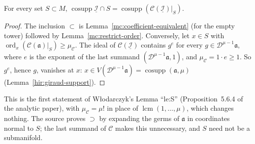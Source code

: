 \begin{lemma}
\label{mc:coefficient-restriction-support}
\leanok
For every set \(S\subset M\), \(\operatorname{cosupp}\underline{\mathcal I}\cap S=\operatorname{cosupp}(\mathcal C(\underline{\mathcal I})|_S)\).
\end{lemma}
\begin{proof}
\leanok
The inclusion \(\subset\) is Lemma~\ref{mc:coefficient-equivalent} (for the empty tower) followed by Lemma~\ref{mc:restrict-order}. Conversely, let
\(x\in S\) with \(\operatorname{ord}_x(\mathcal C(\mathfrak a)|_S)\ge\mu_{\mathcal C}\). The ideal of \(\mathcal C(\underline{\mathcal I})\) contains
\(g^e\) for every \(g\in\mathcal D^{\mu-1}\mathfrak a\), where \(e\) is the exponent of the last summand \((\mathcal D^{\mu-1}\mathfrak a,1)\), and
\(\mu_{\mathcal C}=1\cdot e\ge1\). So \(g^e\), hence \(g\), vanishes at \(x\): \(x\in V(\mathcal D^{\mu-1}\mathfrak a)=\operatorname{cosupp}(\mathfrak a,\mu)\)
(Lemma~\ref{hir:giraud-support}).
\end{proof}
This is the first statement of Włodarczyk's Lemma ``le:S'' (Proposition~5.6.4 of the analytic paper), with \(\mu_{\mathcal C}=\mu!\) in place of
\(\operatorname{lcm}(1,\dots,\mu)\), which changes nothing. The source proves \(\supset\) by expanding the germs of \(\mathfrak a\) in coordinates normal to \(S\);
the last summand of \(\mathcal C\) makes this unnecessary, and \(S\) need not be a submanifold.

